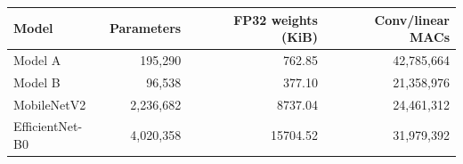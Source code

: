 \begin{tabular}{lrrr}
\toprule
Model & Parameters & FP32 weights (KiB) & Conv/linear MACs \\
\midrule
Model A & 195,290 & 762.85 & 42,785,664 \\
Model B & 96,538 & 377.10 & 21,358,976 \\
MobileNetV2 & 2,236,682 & 8737.04 & 24,461,312 \\
EfficientNet-B0 & 4,020,358 & 15704.52 & 31,979,392 \\
\bottomrule
\end{tabular}
